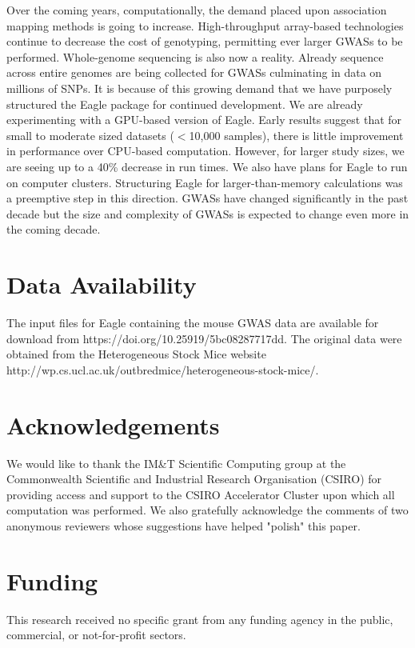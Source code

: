 \documentclass{bioinfo}
\begin{document}
Over the coming years, computationally, the demand placed upon association mapping methods is going to increase. 
High-throughput array-based technologies continue to decrease the cost of genotyping, permitting ever larger GWASs to be performed. 
Whole-genome sequencing is also now a reality. Already sequence across entire genomes are being collected for GWASs \citep{gudbjartsson2015large, long2017whole}
culminating in data on millions of SNPs. It is because of this growing demand that 
we have purposely structured the Eagle package for continued development. We are already experimenting with a GPU-based version of Eagle. 
Early results suggest that for small to moderate sized datasets ($<$10,000 samples), there is little improvement in performance over CPU-based 
computation.  However, for larger study sizes, we are seeing up to a 40\% decrease in run times.  
We also have plans for Eagle to run on computer clusters. Structuring Eagle for larger-than-memory calculations was a 
preemptive step in this direction. GWASs have changed significantly in the past decade but the size and complexity of GWASs is expected 
to change even more in the coming decade. 





\section*{Data Availability}
The input files for Eagle containing the mouse GWAS data are available for download from 
https://doi.org/10.25919/5bc08287717dd. The original data were obtained from the Heterogeneous Stock Mice website 
http://wp.cs.ucl.ac.uk/outbredmice/heterogeneous-stock-mice/.  



\section*{Acknowledgements}
We would like to thank the IM\&T Scientific Computing group at the Commonwealth Scientific and Industrial Research Organisation (CSIRO) for providing access and support to the CSIRO Accelerator Cluster upon which all computation was performed. 
We also gratefully acknowledge the comments of two anonymous reviewers whose suggestions have helped "polish" this paper. 


\section*{Funding}
This research received no specific grant from any funding agency in the public, commercial, or not-for-profit sectors.
\end{document}

